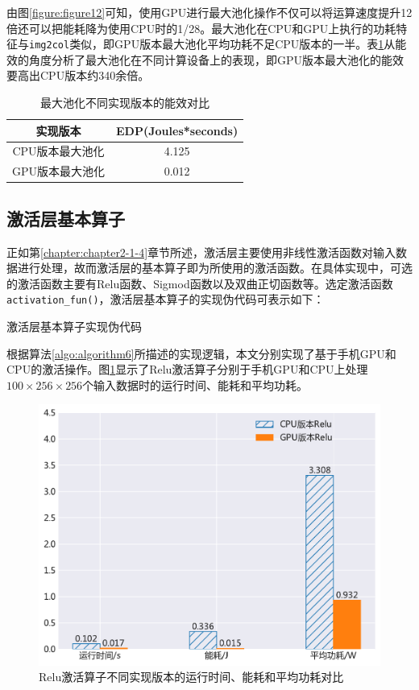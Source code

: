 由图\ref{figure:figure12}可知，使用GPU进行最大池化操作不仅可以将运算速度提升12倍还可以把能耗降为使用CPU时的1/28。最大池化在CPU和GPU上执行的功耗特征与\texttt{img2col}类似，即GPU版本最大池化平均功耗不足CPU版本的一半。表\ref{table:table3}从能效的角度分析了最大池化在不同计算设备上的表现，即GPU版本最大池化的能效要高出CPU版本约340余倍。

\begin{table}[htbp]
  \centering
  \caption{最大池化不同实现版本的能效对比}
  \label{table:table3}
  \begin{tabular}{cc}
    \toprule
      实现版本 & EDP(Joules*seconds) \\
    \midrule
      CPU版本最大池化 & 4.125 \\
      GPU版本最大池化 & 0.012 \\
    \bottomrule
  \end{tabular}
\end{table}


\subsection{激活层基本算子}

正如第\ref{chapter:chapter2-1-4}章节所述，激活层主要使用非线性激活函数对输入数据进行处理，故而激活层的基本算子即为所使用的激活函数。在具体实现中，可选的激活函数主要有Relu函数、Sigmod函数以及双曲正切函数等。选定激活函数\texttt{activation\_fun()}，激活层基本算子的实现伪代码可表示如下：

\begin{algorithm}[htbp]
  \small
  \SetAlgoLined
  \caption{激活层基本算子实现伪代码}
  \label{algo:algorithm6}
\end{algorithm}

根据算法\ref{algo:algorithm6}所描述的实现逻辑，本文分别实现了基于手机GPU和CPU的激活操作。图\ref{figure:figure13}显示了Relu激活算子分别于手机GPU和CPU上处理$100 \times 256 \times 256 $个输入数据时的运行时间、能耗和平均功耗。

\begin{figure}[htb]
    \begin{center}
    \includegraphics[height=0.4\textwidth]{figures/relu_energy.pdf}
    \end{center}
    \caption{Relu激活算子不同实现版本的运行时间、能耗和平均功耗对比}\label{figure:figure13}
\end{figure}

